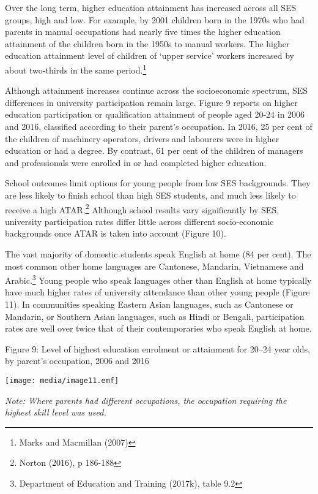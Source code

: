 \documentclass[]{book}
\begin{document}
Over the long term, higher education attainment has increased across all SES groups, high and low. For example, by 2001 children born in the 1970s who had parents in manual occupations had nearly five times the higher education attainment of the children born in the 1950s to manual workers. The higher education attainment level of children of `upper service' workers increased by about two-thirds in the same period.\footnote{Marks and Macmillan (2007)}

Although attainment increases continue across the socioeconomic spectrum, SES differences in university participation remain large. Figure 9 reports on higher education participation or qualification attainment of people aged 20-24 in 2006 and 2016, classified according to their parent's occupation. In 2016, 25 per cent of the children of machinery operators, drivers and labourers were in higher education or had a degree. By contrast, 61 per cent of the children of managers and professionals were enrolled in or had completed higher education.

School outcomes limit options for young people from low SES backgrounds. They are less likely to finish school than high SES students, and much less likely to receive a high ATAR.\footnote{Norton (2016), p 186-188} Although school results vary significantly by SES, university participation rates differ little across different socio-economic backgrounds once ATAR is taken into account (Figure 10).

The vast majority of domestic students speak English at home (84 per cent). The most common other home languages are Cantonese, Mandarin, Vietnamese and Arabic.\footnote{Department of Education and Training (2017k), table 9.2} Young people who speak languages other than English at home typically have much higher rates of university attendance than other young people (Figure 11). In communities speaking Eastern Asian languages, such as Cantonese or Mandarin, or Southern Asian languages, such as Hindi or Bengali, participation rates are well over twice that of their contemporaries who speak English at home.

\protect\hypertarget{_Ref521083533}{}{}Figure 9: Level of highest education enrolment or attainment for 20--24 year olds, by parent's occupation, 2006 and 2016

\texttt{[image: media/image11.emf]}

\emph{Note: Where parents had different occupations, the occupation requiring the highest skill level was used.}
\end{document}
